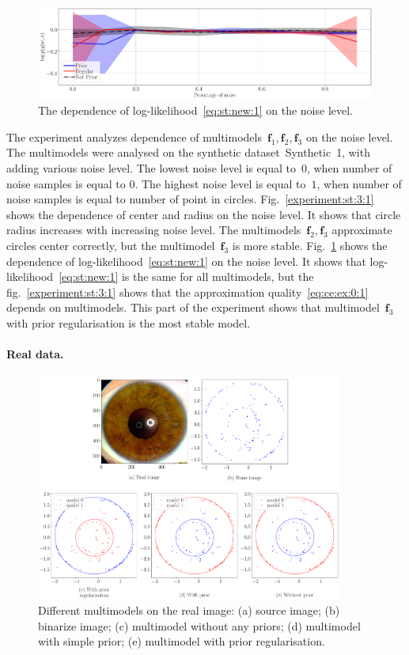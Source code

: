 \documentclass[12pt, twoside]{article}
\numberwithin{equation}{section}
\begin{document}
\begin{figure}[h!t]\center
\includegraphics[width=1\textwidth]{result_eng/experiment_synt_likelihood_progress_noise}
\caption{The dependence of log-likelihood~\eqref{eq:st:new:1} on the noise level.}
\label{experiment:st:3:2}
\end{figure}

The experiment analyzes dependence of multimodels~$\textbf{f}_1, \textbf{f}_2, \textbf{f}_3$ on the noise level. 
The multimodels were analysed on the synthetic dataset~Synthetic~1, with adding various noise level.
The lowest noise level is equal to~$0$, when number of noise samples is equal to $0$. The highest noise level is equal to~$1$, when number of noise samples is equal to number of point in circles.
Fig.~\ref{experiment:st:3:1} shows the dependence of center and radius on the noise level. It shows that circle radius increases with increasing noise level. 
The multimodels~$\textbf{f}_2, \textbf{f}_3$ approximate circles center correctly, but the multimodel~$ \textbf{f}_3$ is more stable.
Fig.~\ref{experiment:st:3:2} shows the dependence of log-likelihood~\eqref{eq:st:new:1} on the noise level. 
It shows that log-likelihood~\eqref{eq:st:new:1} is the same for all multimodels, but the fig.~\ref{experiment:st:3:1} shows that the approximation quality~\eqref{eq:ce:ex:0:1} depends on multimodels.
This part of the experiment shows that multimodel~$\textbf{f}_3$ with prior regularisation is the most stable model.

\paragraph{Real data.}
\begin{figure}[h!t]\center
\includegraphics[width=0.9\textwidth]{result_eng/experiment_real_compare}
\caption{Different multimodels on the real image: (a) source image; (b) binarize image; (c) multimodel without any priors; (d) multimodel with simple prior; (e) multimodel with prior regularisation.}
\label{experiment:2}
\end{figure}
\end{document}
